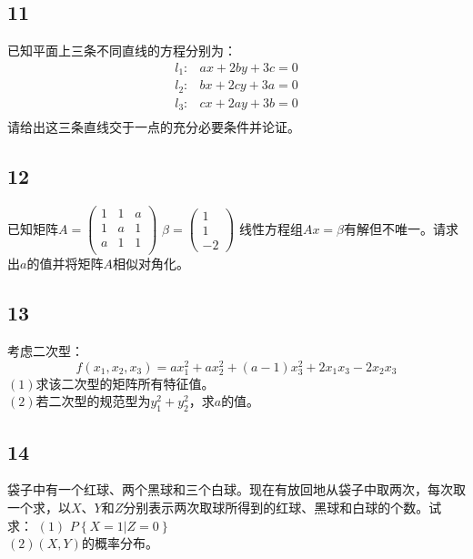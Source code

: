\documentclass[a4paper,12pt]{article}
\begin{document}
\subsection*{11}\noindent 已知平面上三条不同直线的方程分别为：
\begin{equation*}
	\begin{aligned}
		l_{1}:&ax+2by+3c=0\\
		l_{2}:&bx+2cy+3a=0\\
		l_{3}:&cx+2ay+3b=0\\
	\end{aligned}
\end{equation*} 
请给出这三条直线交于一点的充分必要条件并论证。
\subsection*{12}\noindent 已知矩阵$A=\begin{pmatrix}
	1&1&a\\
	1&a&1\\
	a&1&1\\
\end{pmatrix}$ $\beta=\begin{pmatrix}
	1\\1\\-2
\end{pmatrix}$
线性方程组$Ax=\beta$有解但不唯一。请求出$a$的值并将矩阵$A$相似对角化。
\subsection*{13}\noindent 考虑二次型：
\begin{equation*}
	f\left(x_{1},x_{2},x_{3}\right)=ax_{1}^2+ax_{2}^2+\left(a-1\right)x_{3}^2+2x_{1}x_{3}-2x_{2}x_{3}
\end{equation*}
\noindent$\left(1\right)$求该二次型的矩阵所有特征值。\\
\noindent$\left(2\right)$若二次型的规范型为$y_{1}^2+y_{2}^2$，求$a$的值。
\subsection*{14}\noindent 袋子中有一个红球、两个黑球和三个白球。现在有放回地从袋子中取两次，每次取一个求，以$X$、$Y$和$Z$分别表示两次取球所得到的红球、黑球和白球的个数。试求：
\noindent$\left(1\right)$ $P\left\{X=1|Z=0\right\}$\\
\noindent $\left(2\right)$$\left(X,Y\right)$的概率分布。
\end{document}

